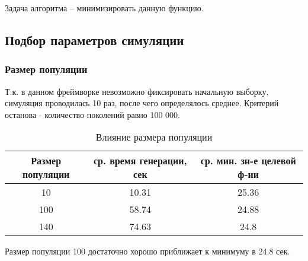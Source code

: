 		Задача алгоритма -- минимизировать данную функцию.
	
	
	\subsection{Подбор параметров симуляции}
		\subsubsection{Размер популяции}
			Т.к. в данном фреймворке невозможно фиксировать начальную выборку, симуляция проводилась 10 раз, после чего определялось среднее. Критерий останова - количество поколений равно 100 000.
			
			\begin{table}[h]
				\centering
				\caption{Влияние размера популяции}
				\label{my-label}
				\begin{tabular}{|c|c|c|}
					\hline
					Размер популяции & ср. время генерации, сек & ср. мин. зн-е целевой ф-ии \\ \hline
					10 & 10.31 & 25.36 \\ \hline
					100 & 58.74 & 24.88 \\ \hline
					140 & 74.63 & 24.8 \\ \hline
				\end{tabular}
			\end{table}
		
			Размер популяции 100 достаточно хорошо приближает к минимуму в 24.8 сек.
			\FloatBarrier
